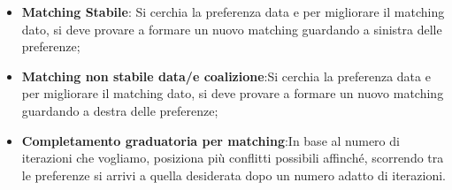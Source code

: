 \documentclass{article}
\theoremstyle{definition}
\theoremstyle{remark}
\begin{document}
\begin{itemize}
    \item \textbf{Matching Stabile}: Si cerchia la preferenza data e per migliorare il matching dato, si deve provare a formare un nuovo matching guardando a sinistra delle preferenze;
    \item \textbf{Matching non stabile data/e coalizione}:Si cerchia la preferenza data e per migliorare il matching dato, si deve provare a formare un nuovo matching guardando a destra delle preferenze;
    \item \textbf{Completamento graduatoria per matching}:In base al numero di iterazioni che vogliamo, posiziona più conflitti possibili affinché, scorrendo tra le preferenze si arrivi a quella desiderata
    dopo un numero adatto di iterazioni.
\end{itemize}
\end{document}
